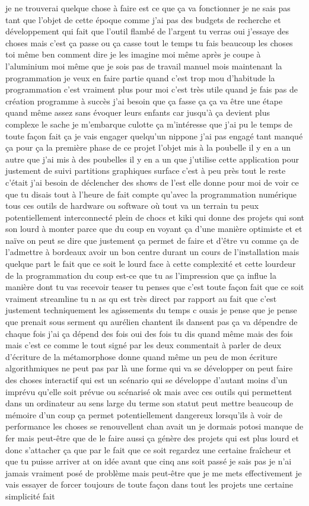 je ne trouverai quelque chose à faire est ce que ça va fonctionner je ne sais pas tant que l'objet de cette époque comme j'ai pas des budgets de recherche et développement qui fait que l'outil flambé de l'argent tu verras oui j'essaye des choses mais c'est ça passe ou ça casse tout le temps tu fais beaucoup les choses toi même ben comment dire je les imagine moi même après je coupe à l'aluminium moi même que je sois pas de travail manuel mois maintenant la programmation je veux en faire partie quand c'est trop mou d'habitude la programmation c'est vraiment plus pour moi c'est très utile quand je fais pas de création programme à succès j'ai besoin que ça fasse ça ça va être une étape quand même assez sans évoquer leurs enfants car jusqu'à ça devient plus complexe le sache je m'embarque culotte ça m'intéresse que j'ai pu le temps de toute façon fait ça je vais engager quelqu'un nippone j'ai pas engagé tant manqué ça pour ça la première phase de ce projet l'objet mis à la poubelle il y en a un autre que j'ai mis à des poubelles il y en a un que j'utilise cette application pour justement de suivi partitions graphiques surface c'est à peu près tout le reste c'était j'ai besoin de déclencher des shows de l'est elle donne pour moi de voir ce que tu disais tout à l'heure de fait compte qu'avec la programmation numérique tous ces outils de hardware ou software où tout va un terrain tu peux potentiellement interconnecté plein de chocs et kiki qui donne des projets qui sont son lourd à monter parce que du coup en voyant ça d'une manière optimiste et et naïve on peut se dire que justement ça permet de faire et d'être vu comme ça de l'admettre à bordeaux avoir un bon centre durant un cours de l'installation mais quelque part le fait que ce soit le lourd face à cette complexité et cette lourdeur de la programmation du coup est-ce que tu as l'impression que ça influe la manière dont tu vas recevoir teaser tu penses que c'est toute façon fait que ce soit vraiment streamline tu n as qu est très direct par rapport au fait que c'est justement techniquement les agissements du temps c ouais je pense que je pense que prenait sous serment qu aurélien chantent ils dansent pas ça va dépendre de chaque fois j'ai ça dépend des fois oui des fois tu dis quand même mais des fois mais c'est ce comme le tout signé par les deux commentait à parler de deux d'écriture de la métamorphose donne quand même un peu de mon écriture algorithmiques ne peut pas par là une forme qui va se développer on peut faire des choses interactif qui est un scénario qui se développe d'autant moins d'un imprévu qu'elle soit prévue ou scénarisé ok mais avec ces outils qui permettent dans un ordinateur au sens large du terme son statut peut mettre beaucoup de mémoire d'un coup ça permet potentiellement dangereux lorsqu'ils à voir de performance les choses se renouvellent chan avait un je dormais potosi manque de fer mais peut-être que de le faire aussi ça génère des projets qui est plus lourd et donc s'attacher ça que par le fait que ce soit regardez une certaine fraîcheur et que tu puisse arriver at on idée avant que cinq ans soit passé je sais pas je n'ai jamais vraiment posé de problème mais peut-être que je me mets effectivement je vais essayer de forcer toujours de toute façon dans tout les projets une certaine simplicité fait 